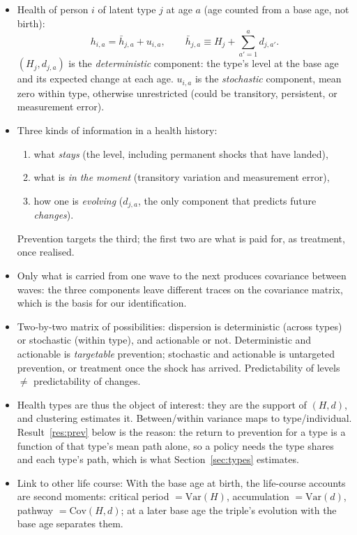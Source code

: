 \documentclass[11pt]{article}
\newcommand{\Var}{\mathrm{Var}}
\newcommand{\Cov}{\mathrm{Cov}}
\begin{document}
	\begin{itemize}
		\item Health of person $i$ of latent type $j$ at age $a$ (age counted from a base age, not birth):
		\begin{equation}
			h_{i,a} = \bar h_{j,a} + u_{i,a}, \qquad \bar h_{j,a} \equiv H_j + \sum_{a'=1}^{a} d_{j,a'} .
			\label{eq:levels}
		\end{equation}
		$(H_j, d_{j,a})$ is the \emph{deterministic} component: the type's level at the base age and its expected change at each age. $u_{i,a}$ is the \emph{stochastic} component, mean zero within type, otherwise unrestricted (could be transitory, persistent, or measurement error).
		\item Three kinds of information in a health history: 
		\begin{enumerate}
			\item what \emph{stays} (the level, including permanent shocks that have landed),
			\item what is \emph{in the moment} (transitory variation and measurement error), 
			\item how one is \emph{evolving} ($d_{j,a}$, the only component that predicts future \emph{changes}).
		\end{enumerate} 
		Prevention targets the third; the first two are what is paid for, as treatment, once realised.
		\item Only what is carried from one wave to the next produces covariance between waves: the three components leave different traces on the covariance matrix, which is the basis for our identification.
		\item Two-by-two matrix of possibilities: dispersion is deterministic (across types) or stochastic (within type), and actionable or not. Deterministic and actionable is \emph{targetable} prevention; stochastic and actionable is untargeted prevention, or treatment once the shock has arrived. Predictability of levels $\neq$ predictability of changes.
		\item Health types are thus the object of interest: they are the support of $(H, d)$, and clustering estimates it. Between/within variance maps to type/individual. Result~\ref{res:prev} below is the reason: the return to prevention for a type is a function of that type's mean path alone, so a policy needs the type shares and each type's path, which is what Section~\ref{sec:types} estimates.
		\item Link to other life course: With the base age at birth, the life-course accounts are second moments: critical period $=\Var(H)$, accumulation $=\Var(d)$, pathway $=\Cov(H,d)$; at a later base age the triple's evolution with the base age separates them.

\end{itemize}
\end{document}
